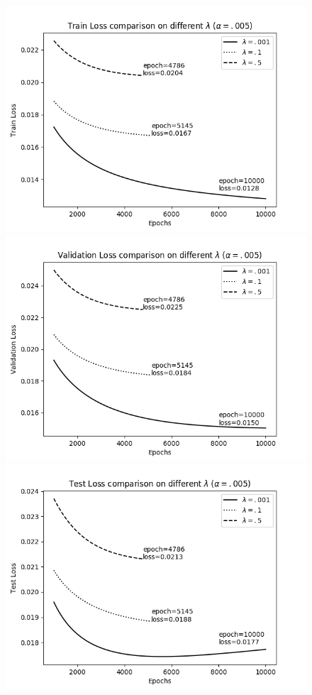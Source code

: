 \documentclass[12pt]{article}
\newenvironment{problem}[2][Problem]{\begin{trivlist}
\item[\hskip \labelsep {\bfseries #1}\hskip \labelsep {\bfseries #2.}]}{\end{trivlist}}
\begin{document}
\begin{problem}{1}
\begin{figure}[!htb]
  \includegraphics[width=\linewidth]{images/a1/1.4/train_loss.png}
\endminipage\hfill
{}
  \includegraphics[width=\linewidth]{images/a1/1.4/valid_loss.png}
\endminipage\hfill
{}%
  \includegraphics[width=\linewidth]{images/a1/1.4/test_loss.png}

\end{figure}
\end{problem}
\end{document}
